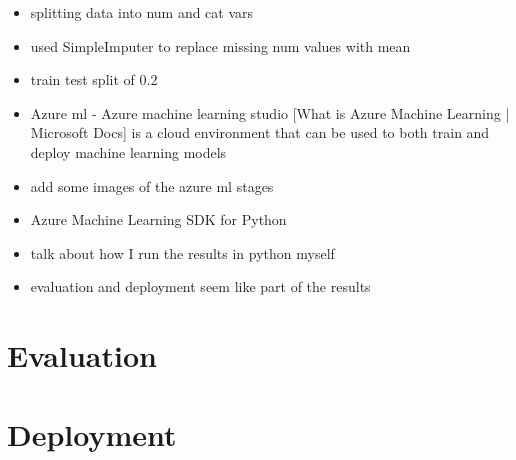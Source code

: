 \begin{itemize}
\item splitting data into num and cat vars 
\item used SimpleImputer to replace missing num values with mean
\item train test split of 0.2
\item Azure ml - Azure machine learning studio [What is Azure Machine Learning | Microsoft Docs] is a cloud environment that can be used to both train and deploy machine learning models 
\item add some images of the azure ml stages
\item Azure Machine Learning SDK for Python
\item talk about how I run the results in python myself
\end{itemize}




\begin{itemize}
\item evaluation and deployment seem like part of the results
\end{itemize}

\section{Evaluation}

\section{Deployment}


